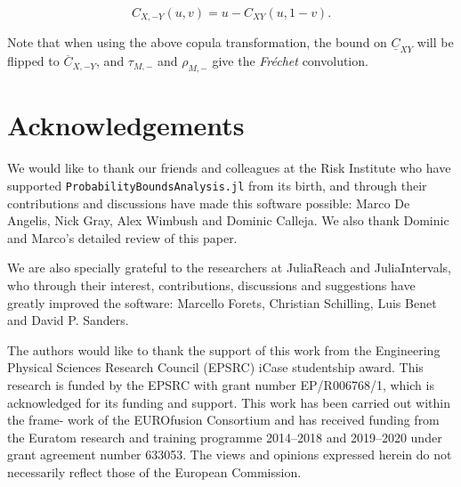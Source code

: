 \documentclass{juliacon}
\begin{document}
\begin{equation*}\label{rotation}
  C_{X, -Y}(u,v) = u - C_{XY}(u, 1 - v).
\end{equation*}

Note that when using the above copula transformation, the bound on $\underline{C}_{XY}$ will be flipped to $\overline{C}_{X, -Y}$, and $\tau_{M, -}$ and $\rho_{M,-}$ give the \textit{Fréchet} convolution.

\section*{Acknowledgements}
We would like to thank our friends and colleagues at the Risk Institute who have supported \texttt{ProbabilityBoundsAnalysis.jl} from its birth, and through their contributions and discussions have made this software possible: Marco De Angelis, Nick Gray, Alex Wimbush and Dominic Calleja. We also thank Dominic and Marco's detailed review of this paper.

We are also specially grateful to the researchers at JuliaReach and JuliaIntervals, who through their interest, contributions, discussions and suggestions have greatly improved the software: Marcello Forets, Christian Schilling, Luis Benet and David P. Sanders.

The authors would like to thank the support of this work from the Engineering Physical Sciences Research Council (EPSRC) iCase studentship award. This research is funded by the EPSRC with grant number EP/R006768/1, which is acknowledged for its funding and support. This work has been carried out within the frame- work of the EUROfusion Consortium and has received funding from the Euratom research and training programme 2014–2018 and 2019–2020 under grant agreement number 633053. The views and opinions expressed herein do not necessarily reflect those of the European Commission.


\end{document}
